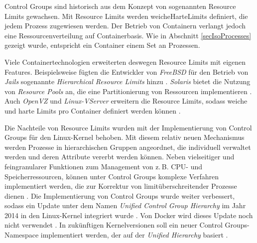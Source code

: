 \documentclass[../main.tex]{subfiles}
\begin{document}
		Control Groups sind historisch aus dem Konzept von sogenannten Resource Limits gewachsen. Mit Resource Limits werden \gls{weicheHarteLimits} definiert, die jedem Prozess zugewiesen werden. Der Betrieb von Containern verlangt jedoch eine Ressourcenverteilung auf Containerbasis. Wie in Abschnitt \ref{secIsoProcesses} gezeigt wurde, entspricht ein Container einem Set an Prozessen.


		Viele Containertechnologien erweiterten deswegen Resource Limits mit eigenen Features. Beispielsweise fügten die Entwickler von \emph{FreeBSD} für den Betrieb von \emph{Jails} sogenannte \emph{Hierarchical Resource Limits} hinzu \cite{freeBsdRCTL}. \emph{Solaris} bietet die Nutzung von \emph{Resource Pools} an, die eine Partitionierung von Ressourcen implementieren \cite{cgroupsUniHierarchyDoc}. Auch \emph{OpenVZ} und \emph{Linux-VServer} erweitern die Resource Limits, sodass weiche und harte Limits pro Container definiert werden können \cite[S.15f.]{dockerSec2}.

		\clearpage

		Die Nachteile von Resource Limits wurden mit der Implementierung von Control Groups für den Linux-Kernel behoben. Mit diesem relativ neuen Mechanismus werden Prozesse in hierarchischen Gruppen angeordnet, die individuell verwaltet werden und deren Attribute vererbt werden können. Neben vielseitiger und feingranularer Funktionen zum Management von z.\,B. CPU- und Speicherressourcen, können unter Control Groups komplexe Verfahren implementiert werden, die zur Korrektur von limitüberschreitender Prozesse dienen \cite{cgroupsRedhat}. Die Implementierung von Control Groups wurde weiter verbessert, sodass ein Update unter dem Namen \emph{Unified Control Group Hierarchy} im Jahr 2014 in den Linux-Kernel integriert wurde \cite{cgroupsFixing}\cite{cgroupsUniHierarchy}. Von Docker wird dieses Update noch nicht verwendet \cite{githubCgroupsUniHierNotSupported}. In zukünftigen Kernelversionen soll ein neuer Control Groups-Namespace implementiert werden, der auf der \emph{Unified Hierarchy} basiert \cite{cgroupNs}.
\end{document}
